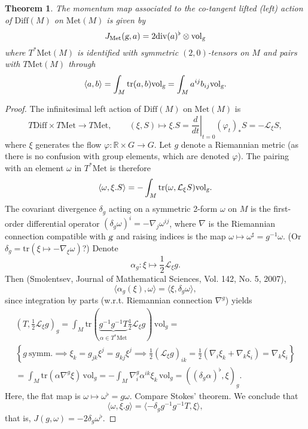 \documentclass{article}
\theoremstyle{plain}
\newtheorem{teo}{Theorem}[section]
\theoremstyle{definition}
\newcommand{\R}{\ensuremath{\mathbb{R}}}
\newcommand{\g}{\ensuremath{\textsl{g}}}
\newcommand{\Diff}{\ensuremath{\mathrm{Diff}}}
\newcommand{\Met}{\ensuremath{\mathrm{Met}}}
\newcommand{\Div}{\ensuremath{\mathrm{div}}}
\newcommand{\Vol}{\ensuremath{\mathrm{vol}}}
\newcommand{\lie}{\ensuremath{\mathcal{L}}}
\newcommand{\tr}{\ensuremath{\mathrm{tr}}}
\begin{document}
\begin{teo}
	The momentum map associated to  the co-tangent lifted (left) action  of $\Diff(M)$ on $\Met(M)$ is given by
	\[
	  J_\Met(\g,a)=2\Div (a)^\flat \otimes \Vol_\g  
	\]
	where $T^*\Met(M)$ is identified with  symmetric $(2,0)$-tensors on $M$ and  pairs with $T\Met(M)$ through
	\[
	\langle a,b\rangle = \int_M \tr (a,b)\Vol_\g=\int_M a^{ij}b_{ij}\Vol_\g.
	\]
\end{teo}

\begin{proof}
	The infinitesimal left action of $\Diff(M)$ on $\Met(M)$ is
	\[
	T\Diff\times T\Met\to T\Met,\qquad (\xi,S)\mapsto\xi.S = \left.\frac{d}{dt}\right|_{t=0} (\varphi_t)_*S = -\lie_\xi S,
	\]
	where $\xi$ generates the flow $\varphi :\R\times G \to G$. Let $g$ denote a Riemannian metric (as there is no confusion with group elements, which are denoted $\varphi$). The pairing with an element $\omega$ in $T^*\Met$ is therefore
	\[
	\langle \omega,\xi.S\rangle = -\int_M \tr (\omega,\lie_\xi S)\Vol_\g.
	\]
	The covariant divergence $\delta_g$ acting on a symmetric 2-form $\omega$ on $M$ is the first-order differential operator $(\delta_g\omega)^i=-\nabla_j\omega^{ij}$, where $\nabla$ is the Riemannian connection compatible with $\g$ and raising indices is the map $\omega\mapsto \omega^\sharp=g^{-1}\omega$. (Or $\delta_g=\tr(\xi\mapsto-\nabla_\xi\omega)$?)
	Denote
	\[
	\alpha_g:\xi\mapsto \frac{1}{2}\lie_\xi g.
	\]
	Then (Smolentsev, Journal of Mathematical Sciences, Vol. 142, No. 5, 2007),
	\[
	\langle\alpha_g(\xi),\omega\rangle=\langle\xi,\delta_g\omega\rangle,
	\]
	since integration by parts (w.r.t. Riemannian connection $\nabla^g$) yields
	\begin{multline*}
	(T,\frac{1}{2}\lie_\xi g)_g=\int_M \tr(\underbrace{g^{-1}g^{-1}T}_{\alpha\in T^*\Met}\frac{1}{2}\lie_\xi g)\,\Vol_g =\\
	\left\{g\ \mathrm{symm.}\implies \xi_k=g_{jk}\xi^j=g_{kj}\xi^j\implies \frac{1}{2}(\lie_\xi g)_{ik}=\frac{1}{2}(\nabla_i\xi_k+\nabla_k\xi_i)=\nabla_k\xi_i\right\}\\
	=\int_M\tr(\alpha \nabla^g\xi)\,\Vol_g=-\int_M \nabla^g_i\alpha^{ik}\xi_k\,\Vol_g=((\delta_g \alpha)^\flat,\xi)_g.
	\end{multline*}
	Here, the flat map is $\omega \mapsto\omega^\flat= g \omega$. Compare Stokes' theorem. We conclude that
	\[
	\langle \omega,\xi.g\rangle=\langle -\delta_g g^{-1}g^{-1}T,\xi\rangle,
	\]
	that is, $J(g,\omega)=-2\delta_g\omega^\flat$.
\end{proof}
\end{document}
